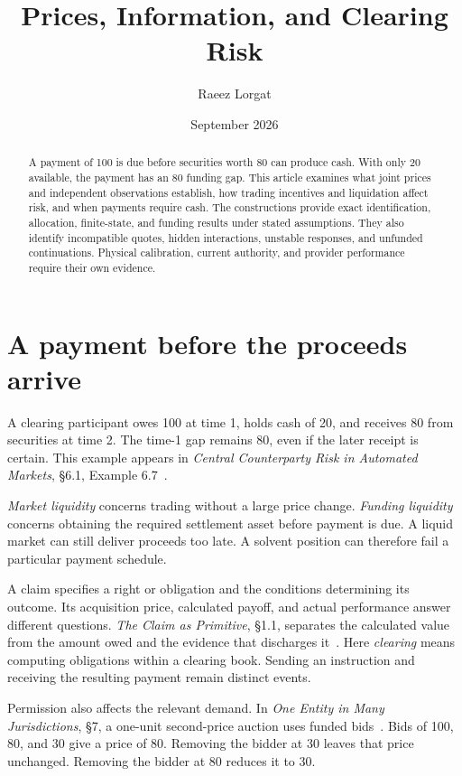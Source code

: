 \documentclass{momentum}
\title{Prices, Information, and Clearing Risk}
\author{Raeez Lorgat}
\date{September 2026}
\begin{document}
\maketitle

\begin{abstract}
A payment of 100 is due before securities worth 80 can produce cash. With only 20 available, the payment has an 80 funding gap. This article examines what joint prices and independent observations establish, how trading incentives and liquidation affect risk, and when payments require cash. The constructions provide exact identification, allocation, finite-state, and funding results under stated assumptions. They also identify incompatible quotes, hidden interactions, unstable responses, and unfunded continuations. Physical calibration, current authority, and provider performance require their own evidence.
\end{abstract}

\section{A payment before the proceeds arrive}

A clearing participant owes 100 at time 1, holds cash of 20, and receives 80 from securities at time 2. The time-1 gap remains 80, even if the later receipt is certain. This example appears in \emph{Central Counterparty Risk in Automated Markets}, \S6.1, Example 6.7~\cite{ccp}.

\emph{Market liquidity} concerns trading without a large price change. \emph{Funding liquidity} concerns obtaining the required settlement asset before payment is due. A liquid market can still deliver proceeds too late. A solvent position can therefore fail a particular payment schedule.

A claim specifies a right or obligation and the conditions determining its outcome. Its acquisition price, calculated payoff, and actual performance answer different questions. \emph{The Claim as Primitive}, \S1.1, separates the calculated value from the amount owed and the evidence that discharges it~\cite{claim}. Here \emph{clearing} means computing obligations within a clearing book. Sending an instruction and receiving the resulting payment remain distinct events.

Permission also affects the relevant demand. In \emph{One Entity in Many Jurisdictions}, \S7, a one-unit second-price auction uses funded bids~\cite{entity}. Bids of 100, 80, and 30 give a price of 80. Removing the bidder at 30 leaves that price unchanged. Removing the bidder at 80 reduces it to 30.
\end{document}
